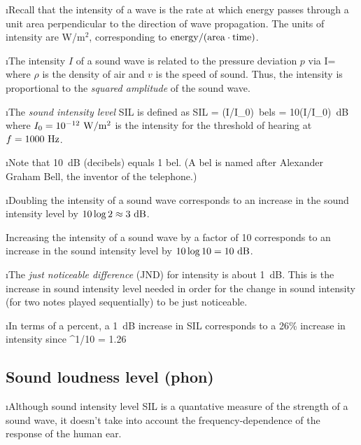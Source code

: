 \i Recall that the intensity of a wave is the
rate at which energy passes through a unit area
perpendicular to the direction of wave propagation.
The units of intensity are W/m$^2$, corresponding 
to ${\rm energy}/({\rm area}\cdot{\rm time})$.

\i The intensity $I$ of a sound wave is related to 
the pressure deviation $p$ via
%
\be
I= 
\label{e:Ivsrho2}
\ee
%
where $\rho$ is the density of air and $v$ is the speed 
of sound.
Thus, the intensity is proportional to the 
{\em squared amplitude} of the sound wave.

\i The {\em sound intensity level} SIL 
 is defined as
%
\be
{\rm SIL} = \log(I/I_0)\ {\rm bels}
= 10\log(I/I_0)\ {\rm dB}
\ee
%
where $I_0=10^{-12}~{\rm W}/{\rm m}^2$ is the intensity
for the threshold of hearing at $f=1000~{\rm Hz}$.

\i Note that 10~dB (decibels) equals 1 bel.
(A bel is named after Alexander Graham Bell, the inventor
of the telephone.)

\i \ex Doubling the intensity of a sound wave
corresponds to an increase in the sound intensity 
level by $10\log 2 \approx 3~{\rm dB}$.

\ex Increasing the intensity of a sound wave by
a factor of 10 corresponds to an increase in the 
sound intensity level by $10\log 10 = 10~{\rm dB}$.

\i The {\em just noticeable difference} (JND) for 
intensity is about 1~dB.
This is the increase in sound intensity level
needed in order for the change in sound intensity 
(for two notes played sequentially) to be just noticeable.

\i In terms of a percent, a 1~dB increase in 
SIL corresponds to a 26\% increase in intensity since
%
^{1/10} = 1.26
\ee

\ei
\subsection{Sound loudness level (phon)}
\bi

\i Although sound intensity level SIL is a 
quantative measure of the strength of a sound wave,
it doesn't take into account the frequency-dependence
of the response of the human ear.


